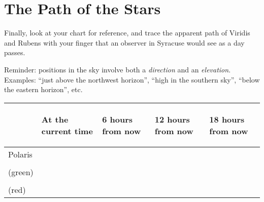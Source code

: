 \documentclass[12pt]{article}
\begin{document}
\section{The Path of the Stars}

Finally, look at your chart for reference, and trace the apparent path of Viridis and Rubens with your finger that an observer in Syracuse would see as a day passes.


\begin{landscape}

Reminder: positions in the sky involve both a {\it direction} and an {\it elevation}. Examples: ``just above the northwest horizon'', ``high in the southern sky'', ``below the eastern horizon'', etc.


	\begin{tabular}{|l|l|l|l|l|}
		\hline
		& \begin{minipage}{2in}\begin{center}At the current time\end{center}\end{minipage} & \begin{minipage}{2in}\begin{center}6 hours from now\end{center}\end{minipage} & \begin{minipage}{2in}\begin{center}12 hours from now\end{center}\end{minipage} & \begin{minipage}{2in}\begin{center}18 hours from now\end{center}\end{minipage} \\ \hline
		\begin{minipage}[c][1.6in][c]{0.5in}Polaris\end{minipage} &                     &                    &                   &                   \\ \hline
		\begin{minipage}[c][1.6in][c]{0.5in}Viridis\\(green)\end{minipage} &                     &                    &                   &                   \\[80pt] \hline
		\begin{minipage}[c][1.6in][c]{0.5in}Rubens\\(red)\end{minipage}  &                     &                    &                   &                   \\[80pt] \hline
	\end{tabular}


\end{landscape}
\end{document}
